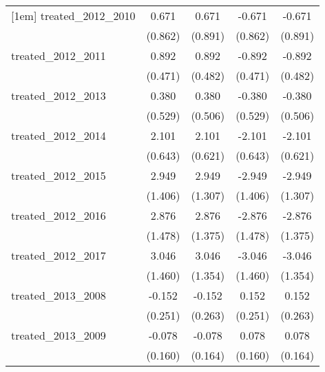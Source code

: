 {\begin{tabular}{l*{4}{c}}
[1em]
treated\_2012\_2010&       0.671         &       0.671         &      -0.671         &      -0.671         \\
            &     (0.862)         &     (0.891)         &     (0.862)         &     (0.891)         \\
[1em]
treated\_2012\_2011&       0.892         &       0.892         &      -0.892         &      -0.892         \\
            &     (0.471)         &     (0.482)         &     (0.471)         &     (0.482)         \\
[1em]
treated\_2012\_2013&       0.380         &       0.380         &      -0.380         &      -0.380         \\
            &     (0.529)         &     (0.506)         &     (0.529)         &     (0.506)         \\
[1em]
treated\_2012\_2014&       2.101\sym{**} &       2.101\sym{***}&      -2.101\sym{**} &      -2.101\sym{***}\\
            &     (0.643)         &     (0.621)         &     (0.643)         &     (0.621)         \\
[1em]
treated\_2012\_2015&       2.949\sym{*}  &       2.949\sym{*}  &      -2.949\sym{*}  &      -2.949\sym{*}  \\
            &     (1.406)         &     (1.307)         &     (1.406)         &     (1.307)         \\
[1em]
treated\_2012\_2016&       2.876         &       2.876\sym{*}  &      -2.876         &      -2.876\sym{*}  \\
            &     (1.478)         &     (1.375)         &     (1.478)         &     (1.375)         \\
[1em]
treated\_2012\_2017&       3.046\sym{*}  &       3.046\sym{*}  &      -3.046\sym{*}  &      -3.046\sym{*}  \\
            &     (1.460)         &     (1.354)         &     (1.460)         &     (1.354)         \\
[1em]
treated\_2013\_2008&      -0.152         &      -0.152         &       0.152         &       0.152         \\
            &     (0.251)         &     (0.263)         &     (0.251)         &     (0.263)         \\
[1em]
treated\_2013\_2009&      -0.078         &      -0.078         &       0.078         &       0.078         \\
            &     (0.160)         &     (0.164)         &     (0.160)         &     (0.164)         \\

\end{tabular}}
